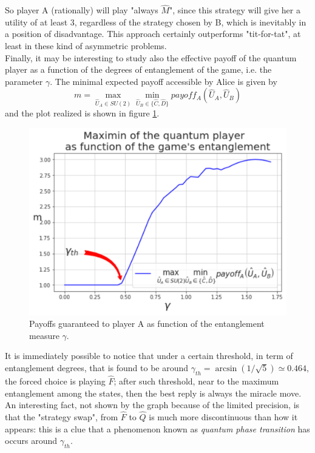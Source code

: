 So player A (rationally) will play "always $\hat{M}$", since this strategy will give her a utility of at least 3, regardless of the strategy chosen by B, which is inevitably in a position of disadvantage. This approach certainly outperforms "tit-for-tat", at least in these kind of asymmetric problems.\\
Finally, it may be interesting to study also the effective payoff of the quantum player as a function of the degrees of entanglement of the game, i.e. the parameter $\gamma$. The minimal expected payoff accessible by Alice is given by
\[ m = \max_{\hat{U}_A\in SU(2)}\min_{\hat{U}_B\in\{\hat{C},\hat{D}\}} payoff_A\left(\hat{U}_A, \hat{U}_B\right) \]
and the plot realized is shown in figure \ref{fig:payoffs_entanglement_PD}. 

\begin{figure}[!ht]
	\centering
	\includegraphics[scale=0.45]{pictures/PD_payoffsentanglement.pdf}
	\caption{Payoffs guaranteed to player A as function of the entanglement measure $\gamma$.}
	\label{fig:payoffs_entanglement_PD}
\end{figure}


It is immediately possible to notice that under a certain threshold, in term of entanglement degrees, that is found to be around $\gamma_{th} = \arcsin\left(1/\sqrt{5}\right)\simeq 0.464$, the forced choice is playing $\hat{F}$; after such threshold, near to the maximum entanglement among the states, then the best reply is always the miracle move. An interesting fact, not shown by the graph because of the limited precision, is that the "strategy swap", from $\hat{F}$ to $\hat{Q}$ is much more discontinuous than how it appears: this is a clue that a phenomenon known as \textit{quantum phase transition} has occurs around $\gamma_{th}$.	




